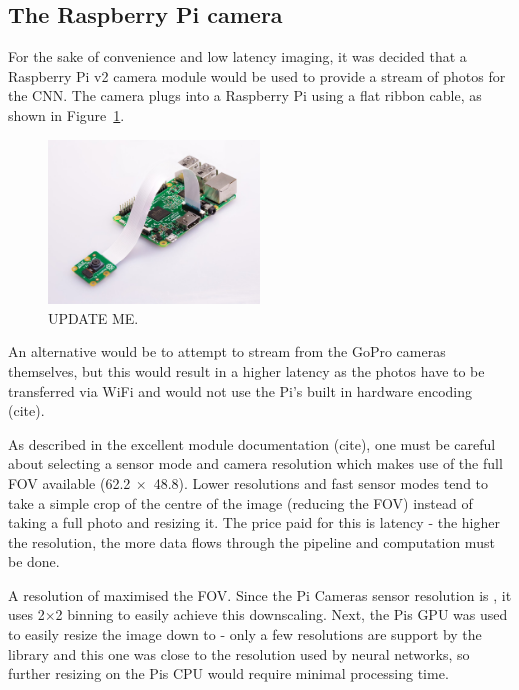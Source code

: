 \subsection{The Raspberry Pi camera}
For the sake of convenience and low latency imaging, it was decided that a Raspberry Pi v2 camera module would be used to provide a stream of photos for the CNN. The camera plugs into a Raspberry Pi using a flat ribbon cable, as shown in Figure~\ref{fig:r_pi_camera}.

\begin{figure}[h!]
  \centering
  \includegraphics[width=0.5\textwidth]{methodology/r_pi_camera}
  \caption{\label{fig:r_pi_camera} UPDATE ME.}
\end{figure}

An alternative would be to attempt to stream from the GoPro cameras themselves, but this would result in a higher latency as the photos have to be transferred via WiFi and would not use the Pi's built in hardware encoding {\color{red} (cite)}.

As described in the excellent  module documentation {\color{red} (cite)}, one must be careful about selecting a sensor mode and camera resolution which makes use of the full FOV available (62.2\textdegree $\ \times$ 48.8\textdegree). Lower resolutions and fast sensor modes tend to take a simple crop of the centre of the image (reducing the FOV) instead of taking a full photo and resizing it. The price paid for this is latency - the higher the resolution, the more data flows through the pipeline and computation must be done. 

A resolution of  maximised the FOV. Since the Pi Cameras sensor resolution is , it uses 2$\times$2 binning to easily achieve this downscaling. Next, the Pis GPU was used to easily resize the image down to  - only a few resolutions are support by the library and this one was close to the resolution used by neural networks, so further resizing on the Pis CPU would require minimal processing time.

